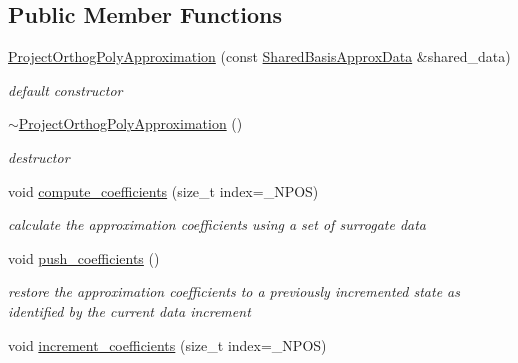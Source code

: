 \subsection*{Public Member Functions}
\begin{DoxyCompactItemize}
\item 
\hyperlink{classPecos_1_1ProjectOrthogPolyApproximation_a25356986e1e97db9a693bab27f8fd97b}{Project\+Orthog\+Poly\+Approximation} (const \hyperlink{classPecos_1_1SharedBasisApproxData}{Shared\+Basis\+Approx\+Data} \&shared\+\_\+data)\label{classPecos_1_1ProjectOrthogPolyApproximation_a25356986e1e97db9a693bab27f8fd97b}

\begin{DoxyCompactList}\small\item\em default constructor \end{DoxyCompactList}\item 
\hyperlink{classPecos_1_1ProjectOrthogPolyApproximation_acb0c923e1bb0946f9f652d1ed6597f27}{$\sim$\+Project\+Orthog\+Poly\+Approximation} ()\label{classPecos_1_1ProjectOrthogPolyApproximation_acb0c923e1bb0946f9f652d1ed6597f27}

\begin{DoxyCompactList}\small\item\em destructor \end{DoxyCompactList}\item 
void \hyperlink{classPecos_1_1ProjectOrthogPolyApproximation_aef8f0c32bdeff7756a9c614607c03058}{compute\+\_\+coefficients} (size\+\_\+t index=\+\_\+\+N\+P\+OS)\label{classPecos_1_1ProjectOrthogPolyApproximation_aef8f0c32bdeff7756a9c614607c03058}

\begin{DoxyCompactList}\small\item\em calculate the approximation coefficients using a set of surrogate data \end{DoxyCompactList}\item 
void \hyperlink{classPecos_1_1ProjectOrthogPolyApproximation_a150c32326f6c12d2303806005715706e}{push\+\_\+coefficients} ()\label{classPecos_1_1ProjectOrthogPolyApproximation_a150c32326f6c12d2303806005715706e}

\begin{DoxyCompactList}\small\item\em restore the approximation coefficients to a previously incremented state as identified by the current data increment \end{DoxyCompactList}\item 
void \hyperlink{classPecos_1_1ProjectOrthogPolyApproximation_a8ba12605934048176c1d1c5722465523}{increment\+\_\+coefficients} (size\+\_\+t index=\+\_\+\+N\+P\+OS)\label{classPecos_1_1ProjectOrthogPolyApproximation_a8ba12605934048176c1d1c5722465523}


\end{DoxyCompactItemize}
